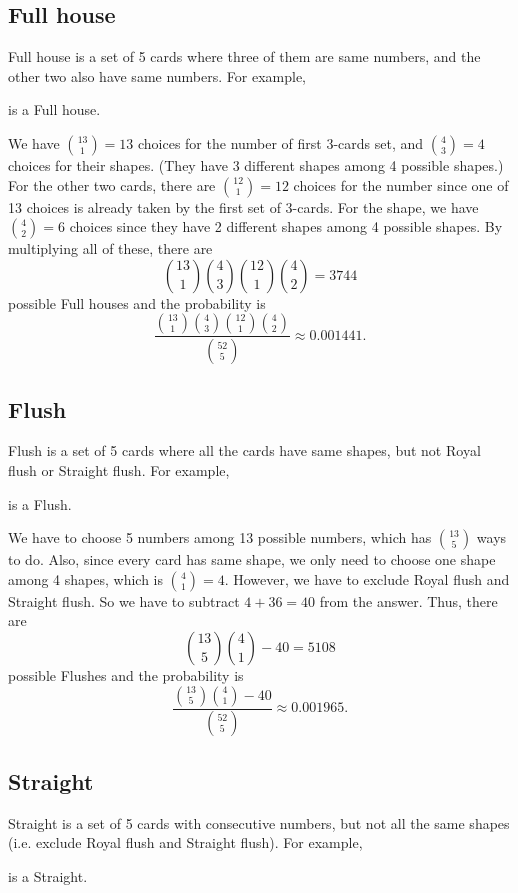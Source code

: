 \documentclass{article}
\begin{document}
\subsection*{Full house}

Full house is a set of 5 cards where three of them are same numbers, and the other two also have same numbers. For example, 
\begin{center}
{ \twoh{} \twoc{} \twos{} \sixh{} \sixc{}}
\end{center}
is a Full house. 

We have $\binom{13}{1} = 13$ choices for the number of first 3-cards set, and $\binom{4}{3} = 4$ choices for their shapes. (They have 3 different shapes among 4 possible shapes.) 
For the other two cards, there are $\binom{12}{1} = 12$ choices for the number since one of 13 choices is already taken by the first set of 3-cards. For the shape, we have $\binom{4}{2} = 6$ choices since they have 2 different shapes among 4 possible shapes. 
By multiplying all of these, there are
$$
\binom{13}{1}\binom{4}{3}\binom{12}{1}\binom{4}{2} = 3744
$$
possible Full houses and the probability is
$$
\frac{\binom{13}{1}\binom{4}{3}\binom{12}{1}\binom{4}{2} }{\binom{52}{5}} \approx 0.001441.
$$



\subsection*{Flush}

Flush is a set of 5 cards where all the cards have same shapes, but not Royal flush or Straight flush. For example, 
\begin{center}
{ \As{} \fives{} \sevs{} \Js{} \Ks}
\end{center}
is a Flush. 

We have to choose 5 numbers among 13 possible numbers, which has $\binom{13}{5}$ ways to do. Also, since every card has same shape, we only need to choose one shape among 4 shapes, which is $\binom{4}{1} =4$. 
However, we have to exclude Royal flush and Straight flush. So we have to subtract $4 + 36 = 40$ from the answer. 
Thus, there are
$$
\binom{13}{5}\binom{4}{1} - 40 = 5108
$$
possible Flushes and the probability is 
$$
\frac{\binom{13}{5}\binom{4}{1} - 40}{\binom{52}{5}} \approx 0.001965.
$$




\subsection*{Straight}
Straight is a set of 5 cards with consecutive numbers, but not all the same shapes (i.e. exclude Royal flush and Straight flush). For example, 
\begin{center}
{ \tres{} \fourd{} \fives{} \sixc{} \sevh{} }
\end{center}
is a Straight. 
\end{document}

